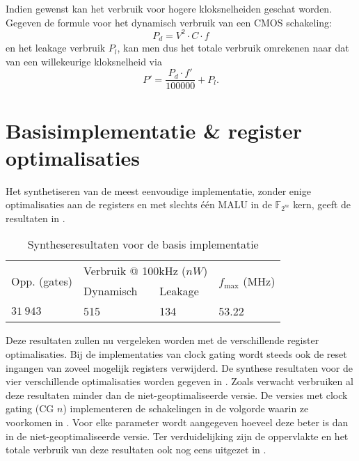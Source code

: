 
Indien gewenst kan het verbruik voor hogere kloksnelheiden geschat worden. Gegeven de formule voor het dynamisch verbruik van een CMOS schakeling:
\[P_d = V^2 \cdot C \cdot f\]
en het leakage verbruik $P_l$, kan men dus het totale verbruik omrekenen naar dat van een willekeurige kloksnelheid via
\[P' = \frac{P_d \cdot f'}{100 000} + P_l.\]

\section{Basisimplementatie \& register optimalisaties\label{section-resultaten-basisimplementatie}}

Het synthetiseren van de meest eenvoudige implementatie, zonder enige optimalisaties aan de registers en met slechts \'e\'en MALU in de $\mathbb{F}_{2^m}$ kern, geeft de resultaten in .

\begin{table}[h]
	\caption{Syntheseresultaten voor de basis implementatie}
	\label{tabel-resultaten-basis}

	\centering
	\begin{tabular}{|l|l|l|l|}
		\hline
		\multirow{2}{*}{Opp. (gates)}	& \multicolumn{2}{c|}{Verbruik @ 100kHz ($nW$)}	& \multirow{2}{*}{$f_{\text{max}}$ (MHz)}\\
		\cline{2-3}
		& Dynamisch	& Leakage	& \\
		\hline
		$31\:943$	& 515	& 134	& 53.22\\
		\hline		
	\end{tabular}
\end{table}

Deze resultaten zullen nu vergeleken worden met de verschillende register optimalisaties. Bij de implementaties van clock gating wordt steeds ook de reset ingangen van zoveel mogelijk registers verwijderd. De synthese resultaten voor de vier verschillende optimalisaties worden gegeven in . Zoals verwacht verbruiken al deze resultaten minder dan de niet-geoptimaliseerde versie. De versies met clock gating (CG $n$) implementeren de schakelingen in de volgorde waarin ze voorkomen in . Voor elke parameter wordt aangegeven hoeveel deze beter is dan in de niet-geoptimaliseerde versie. Ter verduidelijking zijn de oppervlakte en het totale verbruik van deze resultaten ook nog eens uitgezet in .

